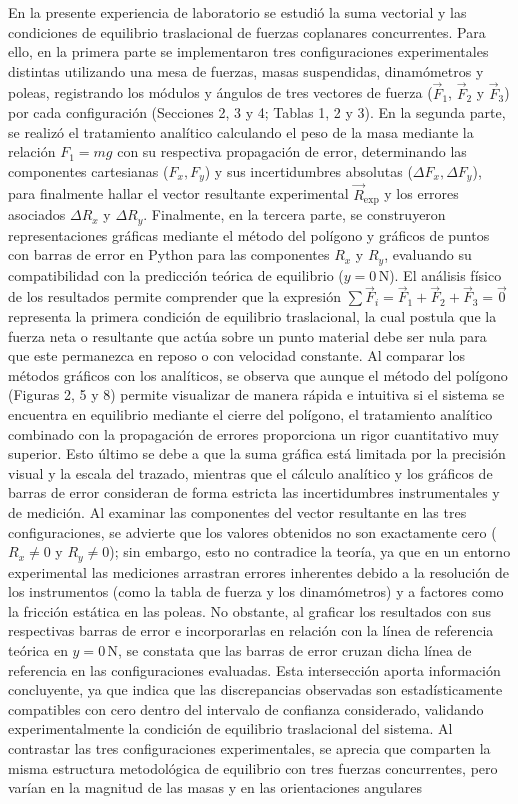 \documentclass[12pt,a4paper]{article}
\begin{document}
En la presente experiencia de laboratorio se estudió la suma vectorial y las condiciones de equilibrio traslacional de fuerzas coplanares concurrentes. Para ello, en la primera parte se implementaron tres configuraciones experimentales distintas utilizando una mesa de fuerzas, masas suspendidas, dinamómetros y poleas, registrando los módulos y ángulos de tres vectores de fuerza ($\vec{F}_1$, $\vec{F}_2$ y $\vec{F}_3$) por cada configuración (Secciones 2, 3 y 4; Tablas 1, 2 y 3). En la segunda parte, se realizó el tratamiento analítico calculando el peso de la masa mediante la relación $F_1 = mg$ con su respectiva propagación de error, determinando las componentes cartesianas ($F_x, F_y$) y sus incertidumbres absolutas ($\Delta F_x, \Delta F_y$), para finalmente hallar el vector resultante experimental $\vec{R}_{\text{exp}}$ y los errores asociados $\Delta R_x$ y $\Delta R_y$. Finalmente, en la tercera parte, se construyeron representaciones gráficas mediante el método del polígono y gráficos de puntos con barras de error en Python para las componentes $R_x$ y $R_y$, evaluando su compatibilidad con la predicción teórica de equilibrio ($y = 0\,\mathrm{N}$).   El análisis físico de los resultados permite comprender que la expresión $\sum \vec{F}_i = \vec{F}_1 + \vec{F}_2 + \vec{F}_3 = \vec{0}$ representa la primera condición de equilibrio traslacional, la cual postula que la fuerza neta o resultante que actúa sobre un punto material debe ser nula para que este permanezca en reposo o con velocidad constante. Al comparar los métodos gráficos con los analíticos, se observa que aunque el método del polígono (Figuras 2, 5 y 8) permite visualizar de manera rápida e intuitiva si el sistema se encuentra en equilibrio mediante el cierre del polígono, el tratamiento analítico combinado con la propagación de errores proporciona un rigor cuantitativo muy superior. Esto último se debe a que la suma gráfica está limitada por la precisión visual y la escala del trazado, mientras que el cálculo analítico y los gráficos de barras de error consideran de forma estricta las incertidumbres instrumentales y de medición. Al examinar las componentes del vector resultante en las tres configuraciones, se advierte que los valores obtenidos no son exactamente cero ($R_x \neq 0$ y $R_y \neq 0$); sin embargo, esto no contradice la teoría, ya que en un entorno experimental las mediciones arrastran errores inherentes debido a la resolución de los instrumentos (como la tabla de fuerza y los dinamómetros) y a factores como la fricción estática en las poleas. No obstante, al graficar los resultados con sus respectivas barras de error e incorporarlas en relación con la línea de referencia teórica en $y = 0\,\mathrm{N}$, se constata que las barras de error cruzan dicha línea de referencia en las configuraciones evaluadas. Esta intersección aporta información concluyente, ya que indica que las discrepancias observadas son estadísticamente compatibles con cero dentro del intervalo de confianza considerado, validando experimentalmente la condición de equilibrio traslacional del sistema. Al contrastar las tres configuraciones experimentales, se aprecia que comparten la misma estructura metodológica de equilibrio con tres fuerzas concurrentes, pero varían en la magnitud de las masas y en las orientaciones angulares 
\end{document}
